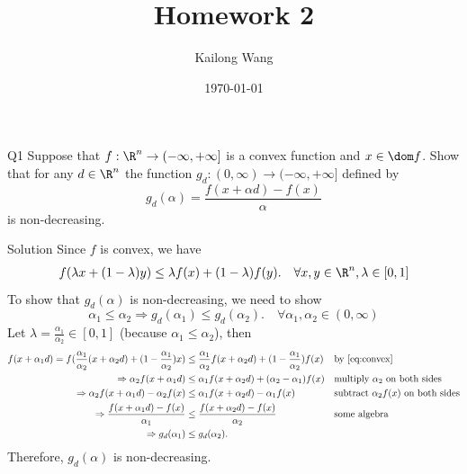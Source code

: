 \documentclass{article}
\title{Homework 2}
\author{Kailong Wang}
\date{\today}
\theoremstyle{plain}
\theoremstyle{definition}
\theoremstyle{remark}
\begin{document}
\maketitle

\begin{problem}
    {Q1}
    Suppose that $f:\R^n\rightarrow(-\infty, +\infty]$ is a convex function and $x \in \dom f$. Show that for any $d\in\R^n$ the function $g_d:(0,\infty)\rightarrow(-\infty,+\infty]$ defined by
    \[
        g_d(\alpha) = \frac{f(x+\alpha d)-f(x)}{\alpha}
    \]
    is non-decreasing.
\end{problem}

\begin{solution}
    {Solution}
    Since $f$ is convex, we have
    \begin{align}
        f(\lambda x + (1-\lambda)y) \leq \lambda f(x) + (1-\lambda)f(y). \quad \forall x, y \in \R^n, \lambda \in [0, 1] \label{eq:convex}
    \end{align}
    To show that $g_d(\alpha)$ is non-decreasing, we need to show
    \[\alpha_1 \leq \alpha_2 \Rightarrow g_d(\alpha_1) \leq g_d(\alpha_2). \quad \forall \alpha_1, \alpha_2 \in (0, \infty)\]
    Let $\lambda=\frac{\alpha_1}{\alpha_2}\in[0,1]$ (because $\alpha_1 \leq \alpha_2$), then
    \begin{align*}
        f(x+\alpha_1d) = f(\frac{\alpha_1}{\alpha_2}(x+\alpha_2d) + (1-\frac{\alpha_1}{\alpha_2})x)
        &\leq \frac{\alpha_1}{\alpha_2}f(x+\alpha_2d) + (1-\frac{\alpha_1}{\alpha_2})f(x) &&\text{by \cref{eq:convex}}\\
        \Rightarrow \alpha_2f(x+\alpha_1d)
        &\leq \alpha_1f(x+\alpha_2d) + (\alpha_2-\alpha_1)f(x) &&\text{multiply $\alpha_2$ on both sides}\\
        \Rightarrow \alpha_2f(x+\alpha_1d) - \alpha_2f(x)
        &\leq \alpha_1f(x+\alpha_2d) - \alpha_1f(x) &&\text{subtract $\alpha_2f(x)$ on both sides}\\
        \Rightarrow \frac{f(x+\alpha_1d)-f(x)}{\alpha_1}
        &\leq \frac{f(x+\alpha_2d)-f(x)}{\alpha_2} &&\text{some algebra}\\
        \Rightarrow g_d(\alpha_1) &\leq g_d(\alpha_2).
    \end{align*}
    Therefore, $g_d(\alpha)$ is non-decreasing.
\end{solution}
\end{document}
